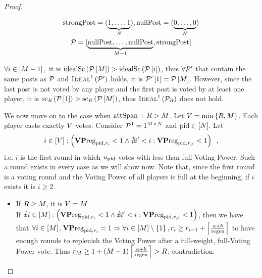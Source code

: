 \documentclass[a4paper,english,cleveref, autoref]{oasics-v2019}
\begin{document}
\begin{subappendices}
\begin{proof}
\begin{itemize}
    \begin{gather*}
      \strongpost = (\underbrace{1, \dots, 1}_{\playerlen}), \nullpost =
      (\underbrace{0, \dots, 0}_{\playerlen}) \\
      \postlist = [\underbrace{\nullpost, \dots, \nullpost}_{\postlen -
      1}, \strongpost]
    \end{gather*}

    $\forall i \in \left[\postlen - 1\right],$ it is
    $\idsc{\postlist\left[\postlen\right]} >
    \idsc{\postlist\left[i\right]}$, thus $\forall \postlist'$ that
    contain the same posts as $\postlist$ and
    $\textsc{Ideal}^1\left(\postlist'\right)$ holds, it is
    $\postlist'\left[1\right] = \postlist\left[\postlen\right]$. However,
    since the last post is not voted by any player and the first post is voted
    by at least one player, it is
    $\mathrm{sc}_\rounds\left(\postlist\left[1\right]\right) >
    \mathrm{sc}_\rounds\left(\postlist\left[\postlen\right]\right)$, thus
    $\textsc{Ideal}^1\left(\postlist_\rounds\right)$ does not hold.

    We now move on to the case when $\attspan + \rounds > \postlen$. Let
    $\votenum = \min{\{\rounds, \postlen\}}$. Each player casts
    exactly $\votenum$ votes. Consider $\postlist^1 = 1^{\postlen \times
    \playerlen}$ and $\pid \in \left[\playerlen\right]$. Let
    \begin{equation*}
      i \in \left[\votenum\right] :\left(\votpowvecreg_{\pid, \round_i} < 1
      \wedge \nexists i' < i: \votpowvecreg_{\pid, \round_{i'}} < 1\right)
      \enspace,
    \end{equation*}
    i.e. $i$ is the first round in which $u_\pid$ votes with less than full
    Voting Power. Such a round exists in every case as we will show now. Note
    that, since the first round is a voting round and the Voting Power of all
    players is full at the beginning, if $i$ exists it is $i \geq 2$.

    \begin{itemize}
      \item If $\rounds \geq \postlen$, it is $\votenum = \postlen$. \\
      If $\nexists i \in \left[\postlen\right] :\left(\votpowvecreg_{\pid,
      \round_i} < 1 \wedge \nexists i' < i: \votpowvecreg_{\pid, \round_{i'}} <
      1\right)$, then we have that $\forall i \in \left[\postlen\right],
      \votpowvecreg_{\pid, \round_i} = 1 \Rightarrow \forall i \in
      \left[\postlen\right] \setminus \left\{1\right\}, \round_i \geq \round_{i
      - 1} + \ceil*{\frac{a + b}{\regen}}$ to have enough rounds to replenish
      the Voting Power after a full-weight, full-Voting Power vote. Thus
      $\round_\postlen \geq 1 + \left(\postlen - 1\right)\ceil*{\frac{a +
      b}{\regen}} > \rounds$, contradiction.


\end{itemize}
\end{itemize}
\end{proof}
\end{subappendices}
\end{document}
